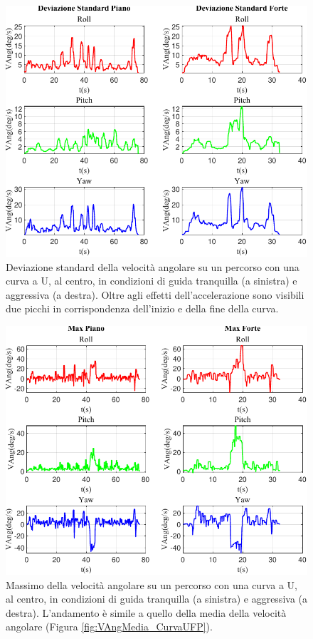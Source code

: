\documentclass[class=article]{standalone}
\begin{document}
	\begin{center}
		\begin{figure}[h!]
			\centering\includegraphics[width=.7\textwidth]{img/CurvaUFP/VAng/Deviazione Standard}
			\caption[]{Deviazione standard della velocità angolare su un percorso con una curva a U, al centro, in condizioni di guida tranquilla (a sinistra) e aggressiva (a destra). Oltre agli effetti dell'accelerazione sono visibili due picchi in corrispondenza dell'inizio e della fine della curva.}
			\label{fig:VAngStd_CurvaUFP}
		\end{figure}
	\end{center}
	
	\begin{center}
		\begin{figure}[h!]
			\centering\includegraphics[width=.7\textwidth]{img/CurvaUFP/VAng/Max}
			\caption[]{Massimo della velocità angolare su un percorso con una curva a U, al centro, in condizioni di guida tranquilla (a sinistra) e aggressiva (a destra). L'andamento è simile a quello della media della velocità angolare (Figura \ref{fig:VAngMedia_CurvaUFP}).}
			\label{fig:VAngMax_CurvaUFP}
		\end{figure}
	\end{center}
	
\end{document}
